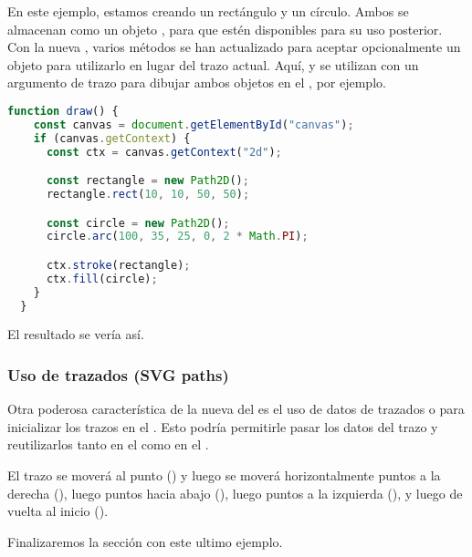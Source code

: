 En este ejemplo, estamos creando un rectángulo y un círculo. Ambos se almacenan como un objeto , para que estén disponibles para su uso posterior. Con la nueva , varios métodos se han actualizado para aceptar opcionalmente un objeto  para utilizarlo en lugar del trazo actual. Aquí,  y  se utilizan con un argumento de trazo para dibujar ambos objetos en el , por ejemplo.

\begin{lstlisting}[language=TypeScript, style=mystyle]
  function draw() {
    const canvas = document.getElementById("canvas");
    if (canvas.getContext) {
      const ctx = canvas.getContext("2d");

      const rectangle = new Path2D();
      rectangle.rect(10, 10, 50, 50);

      const circle = new Path2D();
      circle.arc(100, 35, 25, 0, 2 * Math.PI);

      ctx.stroke(rectangle);
      ctx.fill(circle);
    }
  }
\end{lstlisting}

El resultado se vería así.

\vspace{0.3cm} %
\begin{center}
\end{center}

\subsubsection{Uso de trazados (SVG paths)}

Otra poderosa característica de la nueva  del  es el uso de datos de trazados o  para inicializar los trazos en el . Esto podría permitirle pasar los datos del trazo y reutilizarlos tanto en el  como en el .

El trazo se moverá al punto () y luego se moverá horizontalmente  puntos a la derecha (), luego  puntos hacia abajo (), luego  puntos a la izquierda (), y luego de vuelta al inicio ().

\vspace{0.5cm} %
Finalizaremos la sección  con este ultimo ejemplo.


